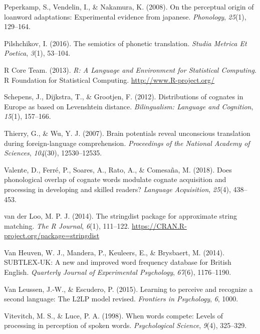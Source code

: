 \documentclass[
]{article}
\newlength{\cslhangindent}
\newenvironment{CSLReferences}[2] %
 {\begin{list}{}{%
  \setlength{\itemindent}{0pt}
  \setlength{\leftmargin}{0pt}
  \setlength{\parsep}{0pt}
  \ifodd #1
   \setlength{\leftmargin}{\cslhangindent}
   \setlength{\itemindent}{-1\cslhangindent}
  \fi
  \setlength{\itemsep}{#2\baselineskip}}}
 {\end{list}}
\begin{document}
\begin{CSLReferences}{1}{0}
Peperkamp, S., Vendelin, I., \& Nakamura, K. (2008). On the perceptual
origin of loanword adaptations: Experimental evidence from japanese.
\emph{Phonology}, \emph{25}(1), 129--164.

Pilshchikov, I. (2016). The semiotics of phonetic translation.
\emph{Studia Metrica Et Poetica}, \emph{3}(1), 53--104.

R Core Team. (2013). \emph{R: {A Language} and {Environment} for
{Statistical Computing}}. R Foundation for Statistical Computing.
\url{http://www.R-project.org/}

Schepens, J., Dijkstra, T., \& Grootjen, F. (2012). Distributions of
cognates in {Europe} as based on {Levenshtein} distance.
\emph{Bilingualism: Language and Cognition}, \emph{15}(1), 157--166.

Thierry, G., \& Wu, Y. J. (2007). Brain potentials reveal unconscious
translation during foreign-language comprehension. \emph{Proceedings of
the National Academy of Sciences}, \emph{104}(30), 12530--12535.

Valente, D., Ferré, P., Soares, A., Rato, A., \& Comesaña, M. (2018).
Does phonological overlap of cognate words modulate cognate acquisition
and processing in developing and skilled readers? \emph{Language
Acquisition}, \emph{25}(4), 438--453.

van der Loo, M. P. J. (2014). The stringdist package for approximate
string matching. \emph{The R Journal}, \emph{6}(1), 111--122.
\url{https://CRAN.R-project.org/package=stringdist}

Van Heuven, W. J., Mandera, P., Keuleers, E., \& Brysbaert, M. (2014).
{SUBTLEX-UK}: {A} new and improved word frequency database for {British
English}. \emph{Quarterly Journal of Experimental Psychology},
\emph{67}(6), 1176--1190.

Van Leussen, J.-W., \& Escudero, P. (2015). Learning to perceive and
recognize a second language: The L2LP model revised. \emph{Frontiers in
Psychology}, \emph{6}, 1000.

Vitevitch, M. S., \& Luce, P. A. (1998). When words compete: Levels of
processing in perception of spoken words. \emph{Psychological Science},
\emph{9}(4), 325--329.


\end{CSLReferences}
\end{document}
